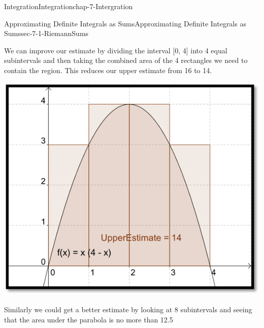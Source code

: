 \documentclass[oneside,10pt,]{book}
\numberwithin{equation}{section}
\begin{document}
\begin{chapterptx}{Integration}{}{Integration}{}{}{chap-7-Intergration}
\begin{sectionptx}{Approximating Definite Integrals as Sums}{}{Approximating Definite Integrals as Sums}{}{}{sec-7-1-RiemannSums}
\begin{sidebyside}{1}{0.2}{0.2}{0}
\begin{sbspanel}{0.6}
\end{sbspanel}%
\end{sidebyside}%
\par
\hypertarget{p-2551}{}%
We can improve our estimate by dividing the interval [0, 4] into 4 equal subintervals and then taking the combined area of the 4 rectangles we need to contain the region.  This reduces our upper estimate from 16 to 14.%
\begin{sidebyside}{1}{0.2}{0.2}{0}%
\begin{sbspanel}{0.6}%
\includegraphics[width=1\linewidth]{images/sec7-1-4.png}
\end{sbspanel}%
\end{sidebyside}%
\par
\hypertarget{p-2552}{}%
Similarly we could get a better estimate by looking at 8 subintervals and seeing that the area under the parabola is no more than 12.5%
\begin{sidebyside}{1}{0.2}{0.2}{0}%
\begin{sbspanel}{0.6}%

\end{sbspanel}
\end{sidebyside}
\end{sectionptx}
\end{chapterptx}
\end{document}
